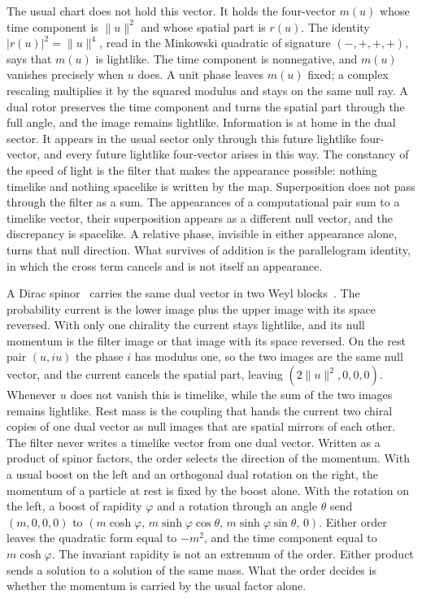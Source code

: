 \documentclass[a4paper]{article}
\begin{document}
The usual chart does not hold this vector. It holds the four-vector $m(u)$ whose time component is $\lVert u\rVert^2$ and whose spatial part is $r(u)$. The identity $|r(u)|^2=\lVert u\rVert^4$, read in the Minkowski quadratic of signature $(-,+,+,+)$, says that $m(u)$ is lightlike. The time component is nonnegative, and $m(u)$ vanishes precisely when $u$ does. A unit phase leaves $m(u)$ fixed; a complex rescaling multiplies it by the squared modulus and stays on the same null ray. A dual rotor preserves the time component and turns the spatial part through the full angle, and the image remains lightlike. Information is at home in the dual sector. It appears in the usual sector only through this future lightlike four-vector, and every future lightlike four-vector arises in this way. The constancy of the speed of light is the filter that makes the appearance possible: nothing timelike and nothing spacelike is written by the map. Superposition does not pass through the filter as a sum. The appearances of a computational pair sum to a timelike vector, their superposition appears as a different null vector, and the discrepancy is spacelike. A relative phase, invisible in either appearance alone, turns that null direction. What survives of addition is the parallelogram identity, in which the cross term cancels and is not itself an appearance.

A Dirac spinor~\cite{dirac1928} carries the same dual vector in two Weyl blocks~\cite{weyl1929}. The probability current is the lower image plus the upper image with its space reversed. With only one chirality the current stays lightlike, and its null momentum is the filter image or that image with its space reversed. On the rest pair $(u,iu)$ the phase $i$ has modulus one, so the two images are the same null vector, and the current cancels the spatial part, leaving $(2\lVert u\rVert^2,0,0,0)$. Whenever $u$ does not vanish this is timelike, while the sum of the two images remains lightlike. Rest mass is the coupling that hands the current two chiral copies of one dual vector as null images that are spatial mirrors of each other. The filter never writes a timelike vector from one dual vector. Written as a product of spinor factors, the order selects the direction of the momentum. With a usual boost on the left and an orthogonal dual rotation on the right, the momentum of a particle at rest is fixed by the boost alone. With the rotation on the left, a boost of rapidity $\varphi$ and a rotation through an angle $\theta$ send $(m,0,0,0)$ to $(m\cosh\varphi,\, m\sinh\varphi\cos\theta,\, m\sinh\varphi\sin\theta,\, 0)$. Either order leaves the quadratic form equal to $-m^2$, and the time component equal to $m\cosh\varphi$. The invariant rapidity is not an extremum of the order. Either product sends a solution to a solution of the same mass. What the order decides is whether the momentum is carried by the usual factor alone.
\end{document}
